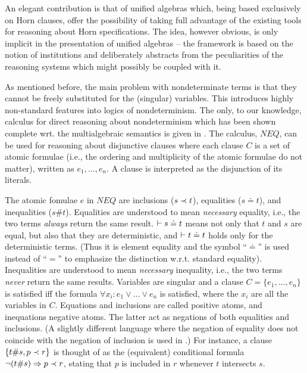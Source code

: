 {An elegant contribution is that of unified algebras which, being based exclusively on Horn clauses, 
offer the possibility of taking full advantage of the existing tools for reasoning about Horn 
specifications. The idea, however obvious, is only implicit in the presentation 
of unified algebras -- the 
framework is based on the notion of institutions and deliberately abstracts from the peculiarities of the 
reasoning systems which might possibly be coupled with it. 

As mentioned before, the main problem with nondeterminate terms is that they cannot be freely 
substituted for the (singular) variables. This introduces highly non-standard features into logics of 
nondeterminism. The only, to our knowledge, calculus for direct reasoning about nondeterminism which 
has been shown complete wrt. the multialgebraic semantics is given in 
\cite{c:126, c:127}. The calculus, $NEQ$, can 
be used for reasoning about disjunctive clauses where each clause $C$ is a set of atomic formulae 
(i.e., the ordering and multiplicity of the atomic formulae do not matter), 
written as $e_{1},\ldots,e_{n}$. A clause is 
interpreted as the disjunction of its literals. 

The atomic fomulae $e$ in $NEQ$ are inclusions ($s\mathrel{\prec} t$),
equalities ($s\doteq t$), and inequalities ($s\# t$). Equalities are
understood to mean {\em necessary} equality, i.e., the two terms {\em
always} return the same result.  $\vdash s\doteq t$ means not only that
$t$ and $s$ are equal, but also that they are deterministic, and $\vdash
t\doteq t$ holds only for the deterministic terms. (Thus it is element
equality and the symbol ``$\doteq$'' is used instead of ``$=$'' to
emphasize the distinction w.r.t. standard equality). Inequalities are
understood to mean {\em necessary} inequality, i.e., the two terms {\em
never} return the same results.  Variables are singular and a clause
$C=\{e_1,...,e_n\}$ is satisfied iff the formula $\forall
x_{i}:e_{1}\lor\ldots\lor e_{n}$ is satisfied, where the $x_{i}$ are
all the variables in $C$.  Equations and inclusions are called
positive atoms, and inequations negative atoms. The latter act as
negations of both equalities and inclusions. (A slightly different
language where the negation of equality does not coincide with the
negation of inclusion is used in \cite{c:130}.) For instance, a clause $\{t\#
s, p\mathrel{\prec} r\}$ is thought of as the (equivalent) conditional formula
$\neg(t\# s) \mathrel{\Rightarrow} p\mathrel{\prec} r$, stating that $p$ is included in $r$
whenever $t$ intersects $s$.  

}

